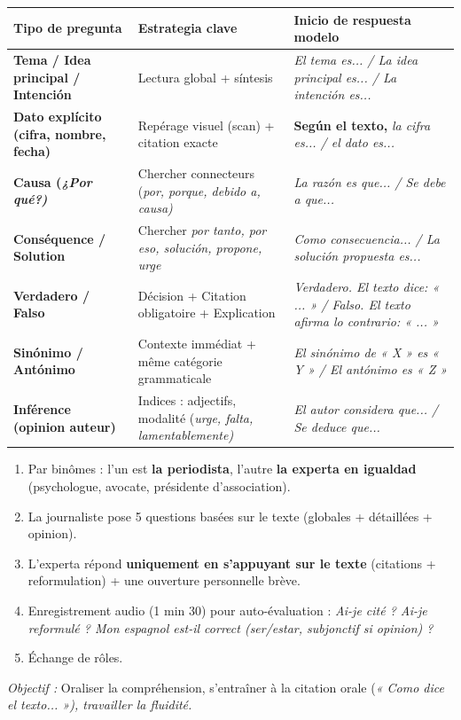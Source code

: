 \documentclass[11pt]{article}
\newcommand{\esp}[1]{\ifmmode\text{\textit{#1}}\else\begingroup\selectlanguage{spanish}\itshape #1\endgroup\fi}
\begin{document}
\begin{center}
\begin{tabularx}{\linewidth}{|>{\bfseries}l|X|X|}
\hline
\rowcolor{popblueL}
\textbf{Tipo de pregunta} & \textbf{Estrategia clave} & \textbf{Inicio de respuesta modelo} \\
\hline
Tema / Idea principal / Intención & Lectura global + síntesis & \esp{El tema es... / La idea principal es... / La intención es...} \\
\hline
Dato explícito (cifra, nombre, fecha) & Repérage visuel (scan) + citation exacte & \textbf{Según el texto,} \esp{la cifra es... / el dato es...} \\
\hline
Causa (\esp{¿Por qué?}) & Chercher connecteurs (\esp{por, porque, debido a, causa}) & \esp{La razón es que... / Se debe a que...} \\
\hline
Conséquence / Solution & Chercher \esp{por tanto, por eso, solución, propone, urge} & \esp{Como consecuencia... / La solución propuesta es...} \\
\hline
Verdadero / Falso & Décision + Citation obligatoire + Explication & \esp{Verdadero. El texto dice: « ... » / Falso. El texto afirma lo contrario: « ... »} \\
\hline
Sinónimo / Antónimo & Contexte immédiat + même catégorie grammaticale & \esp{El sinónimo de « X » es « Y » / El antónimo es « Z »} \\
\hline
Inférence (opinion auteur) & Indices : adjectifs, modalité (\esp{urge, falta, lamentablemente}) & \esp{El autor considera que... / Se deduce que...} \\
\hline
\end{tabularx}
\end{center}

\begin{experience}
\begin{enumerate}
    \item Par binômes : l'un est \textbf{la periodista}, l'autre \textbf{la experta en igualdad} (psychologue, avocate, présidente d'association).
    \item La journaliste pose 5 questions basées sur le texte (globales + détaillées + opinion).
    \item L'experta répond \textbf{uniquement en s'appuyant sur le texte} (citations + reformulation) + une ouverture personnelle brève.
    \item Enregistrement audio (1 min 30) pour auto-évaluation : \emph{Ai-je cité ? Ai-je reformulé ? Mon espagnol est-il correct (ser/estar, subjonctif si opinion) ?}
    \item Échange de rôles.
\end{enumerate}
\emph{Objectif :} Oraliser la compréhension, s'entraîner à la citation orale (\esp{« Como dice el texto... »}), travailler la fluidité.
\end{experience}
\end{document}
